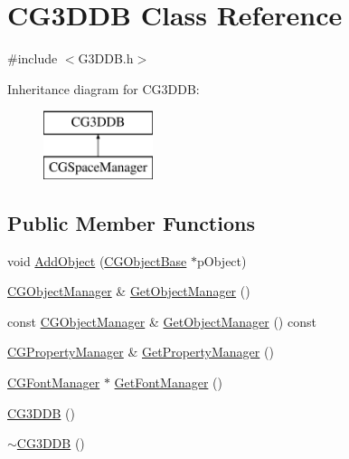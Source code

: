 \hypertarget{class_c_g3_d_d_b}{}\section{C\+G3\+D\+D\+B Class Reference}
\label{class_c_g3_d_d_b}


{\ttfamily \#include $<$G3\+D\+D\+B.\+h$>$}

Inheritance diagram for C\+G3\+D\+D\+B\+:\begin{figure}[H]
\begin{center}
\leavevmode
\includegraphics[height=2.000000cm]{class_c_g3_d_d_b}
\end{center}
\end{figure}
\subsection*{Public Member Functions}
\begin{DoxyCompactItemize}
\item 
void \hyperlink{class_c_g3_d_d_b_ade128a793780b11d6ed3d9880bac1e58}{Add\+Object} (\hyperlink{class_c_g_object_base}{C\+G\+Object\+Base} $\ast$p\+Object)
\item 
\hyperlink{class_c_g_object_manager}{C\+G\+Object\+Manager} \& \hyperlink{class_c_g3_d_d_b_a6f13567c4cc22353c093a2f49486b1a2}{Get\+Object\+Manager} ()
\item 
const \hyperlink{class_c_g_object_manager}{C\+G\+Object\+Manager} \& \hyperlink{class_c_g3_d_d_b_a8f94e9fd99b445aeaee57f76fa7b76ab}{Get\+Object\+Manager} () const 
\item 
\hyperlink{class_c_g_property_manager}{C\+G\+Property\+Manager} \& \hyperlink{class_c_g3_d_d_b_a4fbcf3f5282e98103b80a3ccb99f271c}{Get\+Property\+Manager} ()
\item 
\hyperlink{class_c_g_font_manager}{C\+G\+Font\+Manager} $\ast$ \hyperlink{class_c_g3_d_d_b_a192550a376bcf56cb9f8ff7a233eddca}{Get\+Font\+Manager} ()
\item 
\hyperlink{class_c_g3_d_d_b_a1d401687c135c4d389aa01dd2accd887}{C\+G3\+D\+D\+B} ()
\item 
\hyperlink{class_c_g3_d_d_b_add0053d3e8019f098024af682f4ed72d}{$\sim$\+C\+G3\+D\+D\+B} ()
\end{DoxyCompactItemize}


